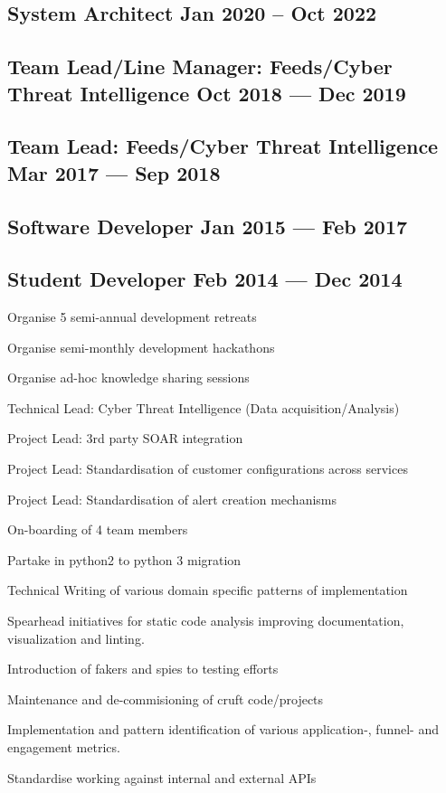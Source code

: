 \subsection{{System Architect \hfill Jan 2020 -- Oct 2022}}
\subsection{{Team Lead/Line Manager: Feeds/Cyber Threat Intelligence \hfill Oct 2018 --- Dec 2019}}
\subsection{{Team Lead: Feeds/Cyber Threat Intelligence \hfill Mar 2017 --- Sep 2018}}
\subsection{{Software Developer \hfill Jan 2015 --- Feb 2017}}
\subsection{{Student Developer \hfill Feb 2014 --- Dec 2014}}


\begin{zitemize}
	\item Organise 5 semi-annual development retreats
	\item Organise semi-monthly development hackathons
	\item Organise ad-hoc knowledge sharing sessions
	\item Technical Lead: Cyber Threat Intelligence (Data acquisition/Analysis)
	\item Project Lead: 3rd party SOAR integration
	\item Project Lead: Standardisation of customer configurations across services
	\item Project Lead: Standardisation of alert creation mechanisms
	\item On-boarding of 4 team members
	\item Partake in python2 to python 3 migration
	\item Technical Writing of various domain specific patterns of implementation
	\item Spearhead initiatives for static code analysis improving documentation, visualization and linting.
	\item Introduction of fakers and spies to testing efforts
	\item Maintenance and de-commisioning of cruft code/projects
	\item Implementation and pattern identification of various application-, funnel- and engagement metrics.
	\item Standardise working against internal and external APIs
\end{zitemize}

